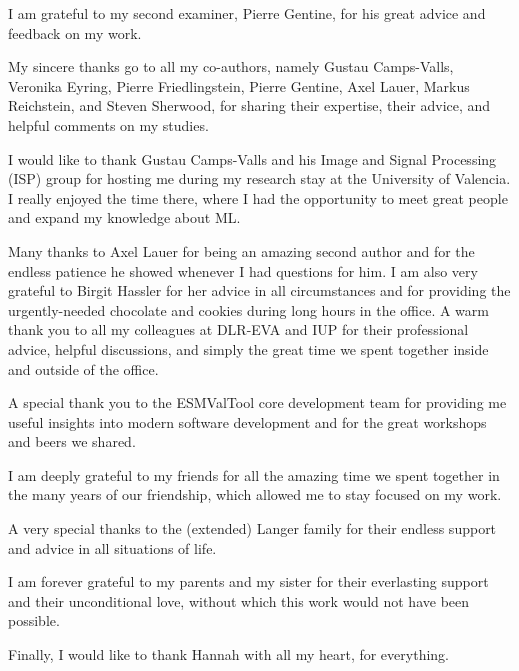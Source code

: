 I am grateful to my second examiner, \Prof{} \Dr{} Pierre Gentine, for his
great advice and feedback on my work.

My sincere thanks go to all my co-authors, namely \Prof{} \Dr{} Gustau
Camps-Valls, \Prof{} \Dr{} Veronika Eyring, \Prof{} \Dr{} Pierre
Friedlingstein, \Prof{} \Dr{} Pierre Gentine, \Dr{} Axel Lauer, \Prof{} \Dr{}
Markus Reichstein, and \Prof{} \Dr{} Steven Sherwood, for sharing their
expertise, their advice, and helpful comments on my studies.

I would like to thank \Prof{} \Dr{} Gustau Camps-Valls and his Image and Signal
Processing (ISP) group for hosting me during my research stay at the University
of Valencia. I really enjoyed the time there, where I had the opportunity to
meet great people and expand my knowledge about \acl{ML}.

Many thanks to \Dr{} Axel Lauer for being an amazing second author and for the
endless patience he showed whenever I had questions for him. I am also very
grateful to \Dr{} Birgit Hassler for her advice in all circumstances and for
providing the urgently-needed chocolate and cookies during long hours in the
office. A warm thank you to all my colleagues at DLR-EVA and IUP for their
professional advice, helpful discussions, and simply the great time we spent
together inside and outside of the office.

A special thank you to the \ac{ESMValTool} core development team for providing
me useful insights into modern software development and for the great workshops
and beers we shared.

I am deeply grateful to my friends for all the amazing time we spent together
in the many years of our friendship, which allowed me to stay focused on my
work.

A very special thanks to the (extended) Langer family for their endless support
and advice in all situations of life.

I am forever grateful to my parents and my sister for their everlasting support
and their unconditional love, without which this work would not have been
possible.

Finally, I would like to thank Hannah with all my heart, for everything.
